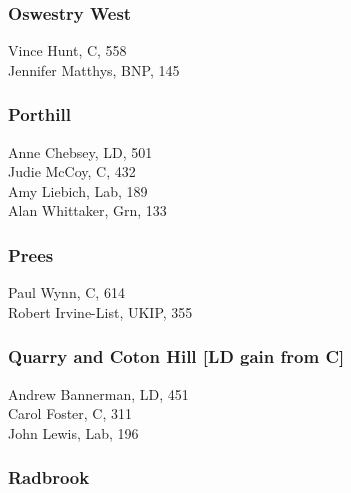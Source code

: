 \documentclass[a4paper,openany,10pt]{book}
\begin{document}
\subsubsection*{Oswestry West}



Vince Hunt, C, 558\\
Jennifer Matthys, BNP, 145\\


\subsubsection*{Porthill}



Anne Chebsey, LD, 501\\
Judie McCoy, C, 432\\
Amy Liebich, Lab, 189\\
Alan Whittaker, Grn, 133\\


\subsubsection*{Prees}



Paul Wynn, C, 614\\
Robert Irvine-List, UKIP, 355\\


\subsubsection*{Quarry and Coton Hill \hspace*{\fill}\nolinebreak[1]%
\enspace\hspace*{\fill}
[LD gain from C]}



Andrew Bannerman, LD, 451\\
Carol Foster, C, 311\\
John Lewis, Lab, 196\\


\subsubsection*{Radbrook}
\end{document}
